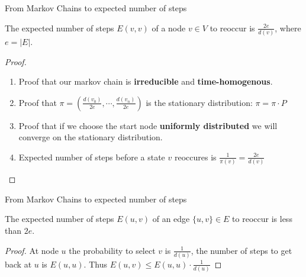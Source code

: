 \begin{frame}{From Markov Chains to expected number of steps}

\begin{theorem}
The expected number of steps $E(v, v)$ of a node $v \in V$ to reoccur is $\frac{2e}{d(v)}$,
where $e = |E|$.
\end{theorem}

\begin{proof}
\begin{enumerate}
\item Proof that our markov chain is \textbf{irreducible} and \textbf{time-homogenous}.
\item Proof that $\pi = (\frac{d(v_0)}{2e}, \cdots, \frac{d(v_n)}{2e})$ is the stationary distribution: $\pi = \pi \cdot P$
\item Proof that if we choose the start node \textbf{uniformly distributed} we will converge on the stationary distribution.
\item Expected number of steps before a state $v$ reoccures is $\frac{1}{\pi(v)} = \frac{2e}{d(v)}$
\end{enumerate}
\end{proof}

\end{frame}

\begin{frame}{From Markov Chains to expected number of steps}

\begin{theorem}
The expected number of steps $E(u, v)$ of an edge $\{u, v\} \in E$  to reoccur is less than $2e$.
\end{theorem}

\begin{proof}
At node $u$ the probability to select $v$ is $\frac{1}{d(u)}$, the number of steps to get back at $u$ is $E(u, u)$.
Thus $E(u, v) \leq E(u, u) \cdot \frac{1}{d(u)}$
\end{proof}

\end{frame}

